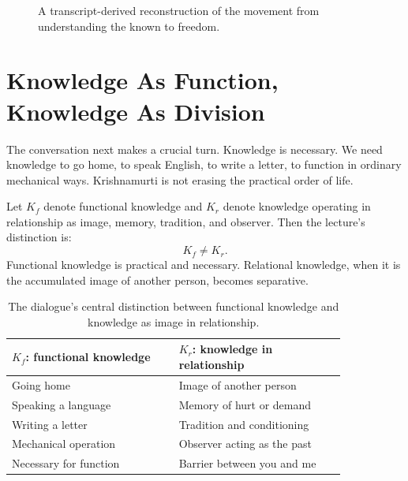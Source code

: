 \begin{figure}
\centering
{}
\caption{A transcript-derived reconstruction of the movement from understanding the known to freedom.}
\end{figure}

\section{Knowledge As Function, Knowledge As Division}

The conversation next makes a crucial turn. Knowledge is necessary. We need knowledge to go home, to speak English, to write a letter, to function in ordinary mechanical ways. Krishnamurti is not erasing the practical order of life.

Let \(K_f\) denote functional knowledge and \(K_r\) denote knowledge operating in relationship as image, memory, tradition, and observer. Then the lecture's distinction is:
\begin{equation}
K_f \neq K_r.
\end{equation}
Functional knowledge is practical and necessary. Relational knowledge, when it is the accumulated image of another person, becomes separative.

\begin{table}
\centering
\begin{tabular}{p{0.42\linewidth} p{0.42\linewidth}}
\hline
\(K_f\): functional knowledge & \(K_r\): knowledge in relationship \\
\hline
Going home & Image of another person \\
Speaking a language & Memory of hurt or demand \\
Writing a letter & Tradition and conditioning \\
Mechanical operation & Observer acting as the past \\
Necessary for function & Barrier between you and me \\
\hline
\end{tabular}
\caption{The dialogue's central distinction between functional knowledge and knowledge as image in relationship.}
\end{table}

